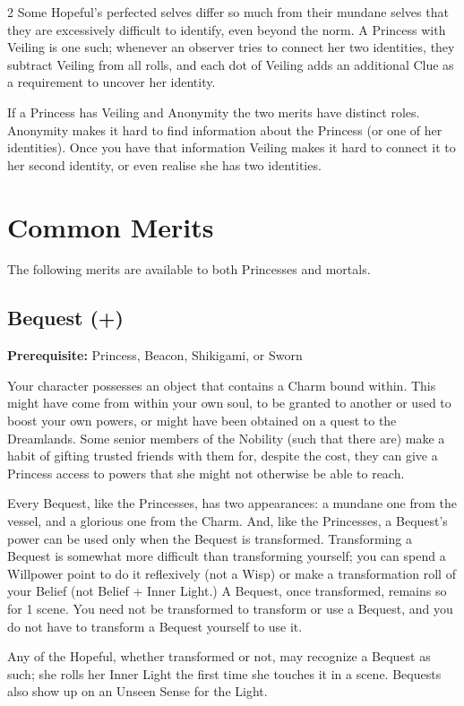 \begin{multicols}{2}
Some Hopeful's perfected selves differ so much from their mundane selves that they are excessively difficult to identify, even beyond the norm. A Princess with Veiling is one such; whenever an observer tries to connect her two identities, they subtract Veiling from all rolls, and each dot of Veiling adds an additional Clue as a requirement to uncover her identity. 

If a Princess has Veiling and Anonymity the two merits have distinct roles. Anonymity makes it hard to find information about the Princess (or one of her identities). Once you have that information Veiling makes it hard to connect it to her second identity, or even realise she has two identities. 


\section*{Common Merits}
The following merits are available to both Princesses and mortals. 

\subsection*{Bequest (\textbullet +)}

\textbf{Prerequisite:} Princess, Beacon, Shikigami, or Sworn

Your character possesses an object that contains a Charm bound within. This might have come from within your own soul, to be granted to another or used to boost your own powers, or might have been obtained on a quest to the Dreamlands. Some senior members of the Nobility (such that there are) make a habit of gifting trusted friends with them for, despite the cost, they can give a Princess access to powers that she might not otherwise be able to reach.

Every Bequest, like the Princesses, has two appearances: a mundane one from the vessel, and a glorious one from the Charm. And, like the Princesses, a Bequest's power can be used only when the Bequest is transformed. Transforming a Bequest is somewhat more difficult than transforming yourself; you can spend a Willpower point to do it reflexively (not a Wisp) or make a transformation roll of your Belief (not Belief + Inner Light.) A Bequest, once transformed, remains so for 1 scene. You need not be transformed to transform or use a Bequest, and you do not have to transform a Bequest yourself to use it.

Any of the Hopeful, whether transformed or not, may recognize a Bequest as such; she rolls her Inner Light the first time she touches it in a scene. Bequests also show up on an Unseen Sense for the Light.


\end{multicols}

